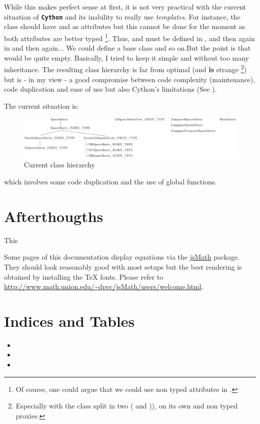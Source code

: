 \documentclass[letterpaper,10pt,english]{sphinxmanual}
\begin{document}
While this makes perfect sense at first, it is not very practical with the current situation of \textbf{\texttt{Cython}} and its inability to really use \emph{templates}. For instance, the  class should have
 and  as attributes but this cannot be done for the moment as both attributes are better typed \footnote{
Of course, one could argue that we could use non typed attributes in .
}. Thus,  and  must be defined in , and then
again in  and then again... We could define a base  class and so on.But the point is that  would be quite empty. Basically, I tried to keep it simple and
without too many inheritance. The resulting class hierarchy is far from optimal (and \textbf{is} strange \footnote{
Especially with the  class split in two ( and )),  on its own and
non typed proxies.
}) but is - in my view - a good compromise between code complexity (maintenance), code
duplication and ease of use but also Cython's limitations (See \footnotemark[1]).

The current situation is:
\begin{figure}[htbp]
\centering
\capstart

\includegraphics[width=700pt]{current_class_hierarchy.pdf}
\caption{Current class hierarchy}\end{figure}

which involves some code duplication and the use of global functions.


\chapter{Afterthougths}
\label{afterthougths::doc}\label{afterthougths:afterthougths}
This

Some pages of this documentation display equations via the \href{http://www.math.union.edu/~dpvc/jsMath/welcome.html}{jsMath} package. They should
look reasonably good with most setups but the best rendering is obtained by
installing the TeX fonts. Please refer to
\href{http://www.math.union.edu/~dpvc/jsMath/users/welcome.html}{http://www.math.union.edu/\textasciitilde{}dpvc/jsMath/users/welcome.html}.


\chapter{Indices and Tables}
\label{contents:indices-and-tables}\begin{itemize}
\item {} 

\item {} 

\item {} 

\end{itemize}



\renewcommand{\indexname}{Index}
\printindex
\end{document}
